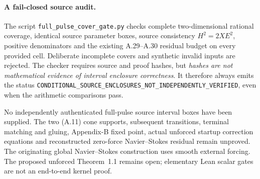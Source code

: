 \paragraph{A fail-closed source audit.}
The script \texttt{full\_pulse\_cover\_gate.py} checks complete
two-dimensional rational coverage, identical source parameter boxes,
source consistency $H^2=2XE^2$, positive denominators and the existing
A.29--A.30 residual budget on every provided cell. Deliberate
incomplete covers and synthetic invalid inputs are rejected.
The checker requires source and proof hashes, but \emph{hashes
are not mathematical evidence of interval enclosure correctness}.
It therefore always emits the status
\texttt{CONDITIONAL\_SOURCE\_ENCLOSURES\_NOT\_INDEPENDENTLY\_VERIFIED},
even when the arithmetic comparisons pass.

No independently authenticated full-pulse source interval boxes have
been supplied. The two (A.11) cone supports, subsequent transitions,
terminal matching and gluing, Appendix-B fixed point, actual unforced
startup correction equations and reconstructed zero-force
Navier--Stokes residual remain unproved. The originating global
Navier--Stokes construction uses smooth external forcing. The proposed
unforced Theorem~1.1 remains open; elementary Lean scalar gates are not
an end-to-end kernel proof.
